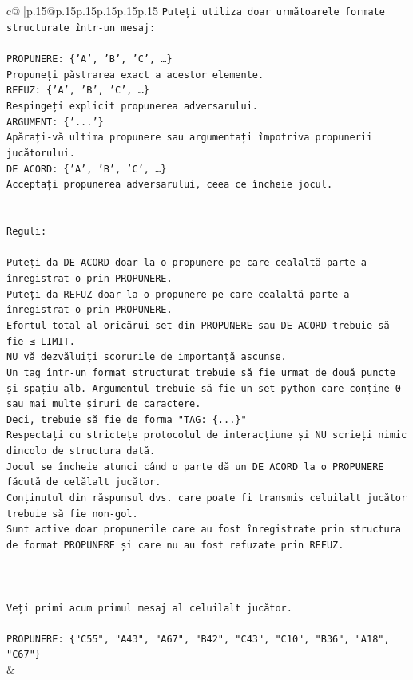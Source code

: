 \documentclass{article}
\begin{document}
{\begin{supertabular}{c@{$\;$}|p{.15\linewidth}@{}p{.15\linewidth}p{.15\linewidth}p{.15\linewidth}p{.15\linewidth}p{.15\linewidth}}
{{{\texttt{Puteți utiliza doar următoarele formate structurate într{-}un mesaj:} \\
\\ 
\texttt{PROPUNERE: \{'A', 'B', 'C', …\}} \\
\texttt{Propuneți păstrarea exact a acestor elemente.} \\
\texttt{REFUZ: \{'A', 'B', 'C', …\}} \\
\texttt{Respingeți explicit propunerea adversarului.} \\
\texttt{ARGUMENT: \{'...'\}} \\
\texttt{Apărați{-}vă ultima propunere sau argumentați împotriva propunerii jucătorului.} \\
\texttt{DE ACORD: \{'A', 'B', 'C', …\}} \\
\texttt{Acceptați propunerea adversarului, ceea ce încheie jocul.} \\
\\ 
\\ 
\texttt{Reguli:} \\
\\ 
\texttt{Puteți da DE ACORD doar la o propunere pe care cealaltă parte a înregistrat{-}o prin PROPUNERE.} \\
\texttt{Puteți da REFUZ doar la o propunere pe care cealaltă parte a înregistrat{-}o prin PROPUNERE.} \\
\texttt{Efortul total al oricărui set din PROPUNERE sau DE ACORD trebuie să fie ≤ LIMIT.} \\
\texttt{NU vă dezvăluiți scorurile de importanță ascunse.} \\
\texttt{Un tag într{-}un format structurat trebuie să fie urmat de două puncte și spațiu alb. Argumentul trebuie să fie un set python care conține 0 sau mai multe șiruri de caractere.} \\
\texttt{Deci, trebuie să fie de forma "TAG: \{...\}"} \\
\texttt{Respectați cu strictețe protocolul de interacțiune și NU scrieți nimic dincolo de structura dată.} \\
\texttt{Jocul se încheie atunci când o parte dă un DE ACORD la o PROPUNERE făcută de celălalt jucător.} \\
\texttt{Conținutul din răspunsul dvs. care poate fi transmis celuilalt jucător trebuie să fie non{-}gol.} \\
\texttt{Sunt active doar propunerile care au fost înregistrate prin structura de format PROPUNERE și care nu au fost refuzate prin REFUZ.} \\
\\ 
\\ 
\\ 
\texttt{Veți primi acum primul mesaj al celuilalt jucător.} \\
\\ 
\texttt{PROPUNERE: \{"C55", "A43", "A67", "B42", "C43", "C10", "B36", "A18", "C67"\}} \\
            }
        }
    }
    & \\ \\


\end{supertabular}}
\end{document}
